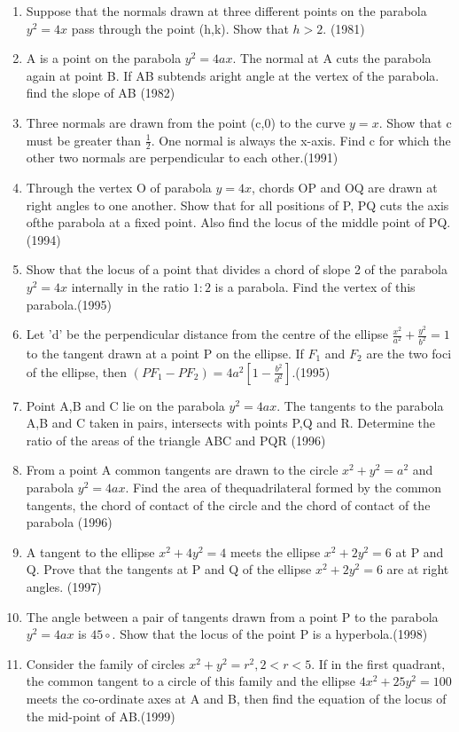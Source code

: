 \documentclass[12pt]{article}
\providecommand{\brak}[1]{\ensuremath{\left(#1\right)}}
\providecommand{\sbrak}[1]{\ensuremath{{}\left[#1\right]}}
\begin{document}
\begin{enumerate}
\item Suppose that the normals drawn at three different points on the parabola $y^2=4x$ pass through the point (h,k). Show that $h>2$. (1981)
\item A is a point on the parabola $y^2=4ax$. The normal at A cuts the parabola again at point B. If AB subtends aright angle at the vertex of the parabola. find the slope of AB
(1982)
\item Three normals are drawn from the point (c,0) to the curve $y=x$. Show that c must be greater than $\frac{1}{2}$. One normal is always the x-axis. Find c for which the other two normals are perpendicular to each other.(1991)
\item Through the vertex O of parabola $y=4x$, chords OP and OQ are drawn at right angles to one another. Show that for all positions of P, PQ cuts the axis ofthe parabola at a fixed point. Also find the locus of the middle point of PQ.(1994)
\item Show that the locus of a point that divides a chord of slope 2 of the parabola $y^2 =4x$ internally in the ratio $1:2$ is a parabola. Find the vertex of this parabola.(1995)
\item Let 'd' be the perpendicular distance from the centre of the ellipse $\frac{x^2}{a^2}+\frac{y^2}{b^2}=1$ to the tangent drawn at a point P on the ellipse. If $F_1$ and $F_2$ are the two foci of the ellipse, then $\brak{PF_1-PF_2}=4a^2\sbrak{1-\frac{b^2}{d^2}}$.(1995)
\item Point A,B and C lie on the parabola $y^2=4ax$. The tangents to the parabola A,B and C taken in pairs, intersects with points P,Q and R. Determine the ratio of the areas of the triangle ABC and PQR (1996)
\item From a point A common tangents are drawn to the circle $x^2+y^2=a^2$ and parabola $y^2=4ax$. Find the area of thequadrilateral formed by the common tangents, the chord of
contact of the circle and the chord of contact of the parabola (1996)
\item A tangent to the ellipse $x^2+4y^2=4$ meets the ellipse $x^2+2y^2=6$ at P and Q. Prove that the tangents at P and Q of the ellipse $x^2+2y^2=6$ are at right angles. (1997)
\item The angle between a pair of tangents drawn from a point P to the parabola $y^2=4ax$ is $45\circ$. Show that the locus of the point P is a hyperbola.(1998)
\item Consider the family of circles $x^2+y^2=r^2,2<r<5$. If in the first quadrant, the common tangent to a circle of this family and the ellipse $4x^2+25y^2=100$ meets the co-ordinate axes at A and B, then find the equation of the locus of the mid-point of AB.(1999)

\end{enumerate}
\end{document}
